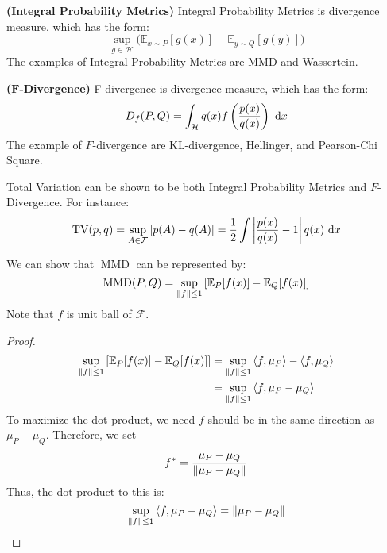 \begin{definition}{\textbf{(Integral Probability Metrics)}}
    Integral Probability Metrics is divergence measure, which has the form:
    \begin{equation*}
        \sup_{g\in\mathcal{H}}\Big(\mathbb{E}_{x\sim P}[g(x)] - \mathbb{E}_{y\sim Q}[g(y)]\Big)
    \end{equation*}
    The examples of Integral Probability Metrics are MMD and Wassertein.
\end{definition}

\begin{definition}{\textbf{($\textbf{F}$-Divergence)}}
    F-divergence is divergence measure, which has the form:
    \begin{equation*}
        D_f(P, Q) = \int_\mathcal{H} q(x)f\left( \frac{p(x)}{q(x)} \right)\ \mathrm{d} x
    \end{equation*}
    The example of $F$-divergence are KL-divergence, Hellinger, and Pearson-Chi Square.
\end{definition}

\begin{remark}
    Total Variation can be shown to be both Integral Probability Metrics and $F$-Divergence. For instance:
    \begin{equation*}
        \text{TV}(p, q) = \sup_{A\in\mathcal{F}}\left| p(A)-q(A) \right| = \frac{1}{2}\int \left| \frac{p(x)}{q(x)} - 1 \right|q(x)\ \mathrm{d} x
    \end{equation*}
\end{remark}

\begin{theorem}
    We can show that $\operatorname{MMD}$ can be represented by:
    \begin{equation*}
        \operatorname{MMD}(P, Q) = \sup_{\left\lVert f\right\rVert\le1}\left[ \mathbb{E}_P[f(x)] - \mathbb{E}_Q[f(x)] \right]
    \end{equation*}
    Note that $f$ is unit ball of $\mathcal{F}$.
\end{theorem}
\begin{proof}
    \begin{equation*}
    \begin{aligned}
        \sup_{\left\lVert f\right\rVert\le1}\left[ \mathbb{E}_P[f(x)] - \mathbb{E}_Q[f(x)] \right] &= \sup_{\left\lVert f\right\rVert\le1} \left\langle f, \mu_P \right\rangle  - \left\langle f, \mu_Q \right\rangle \\
        &= \sup_{\left\lVert f\right\rVert\le1}\left\langle f, \mu_P - \mu_Q \right\rangle \\
    \end{aligned}
    \end{equation*}
    To maximize the dot product, we need $f$ should be in the same direction as $\mu_P - \mu_Q$. Therefore, we set
    \begin{equation*}
        f^* = \frac{\mu_P - \mu_Q}{\left\lVert\mu_P - \mu_Q\right\rVert}
    \end{equation*}
    Thus, the dot product to this is:
    \begin{equation*}
        \sup_{\left\lVert f\right\rVert\le1}\left\langle f, \mu_P - \mu_Q \right\rangle = \left\lVert\mu_P-\mu_Q\right\rVert
    \end{equation*}
\end{proof}

